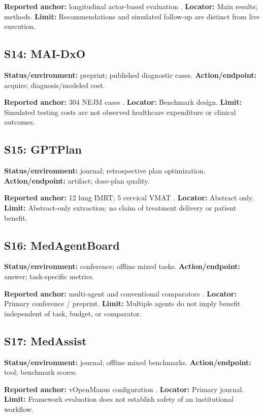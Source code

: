 \documentclass[journal,10pt]{IEEEtran}
\begin{document}
\textbf{Reported anchor:} longitudinal actor-based evaluation \cite{amiemanagement2026}. \textbf{Locator:} Main results; methods. \textbf{Limit:} Recommendations and simulated follow-up are distinct from live execution.

\subsection{S14: MAI-DxO}
\textbf{Status/environment:} preprint; published diagnostic cases. \textbf{Action/endpoint:} acquire; diagnosis/modeled cost.

\textbf{Reported anchor:} 304 NEJM cases \cite{maid2025}. \textbf{Locator:} Benchmark design. \textbf{Limit:} Simulated testing costs are not observed healthcare expenditure or clinical outcomes.

\subsection{S15: GPTPlan}
\textbf{Status/environment:} journal; retrospective plan optimization. \textbf{Action/endpoint:} artifact; dose-plan quality.

\textbf{Reported anchor:} 12 lung IMRT; 5 cervical VMAT \cite{gptplan2025}. \textbf{Locator:} Abstract only. \textbf{Limit:} Abstract-only extraction; no claim of treatment delivery or patient benefit.

\subsection{S16: MedAgentBoard}
\textbf{Status/environment:} conference; offline mixed tasks. \textbf{Action/endpoint:} answer; task-specific metrics.

\textbf{Reported anchor:} multi-agent and conventional comparators \cite{medagentboard2025}. \textbf{Locator:} Primary conference / preprint. \textbf{Limit:} Multiple agents do not imply benefit independent of task, budget, or comparator.

\subsection{S17: MedAssist}
\textbf{Status/environment:} journal; offline mixed benchmarks. \textbf{Action/endpoint:} tool; benchmark scores.

\textbf{Reported anchor:} vOpenManus configuration \cite{medassist2026}. \textbf{Locator:} Primary journal. \textbf{Limit:} Framework evaluation does not establish safety of an institutional workflow.
\end{document}
